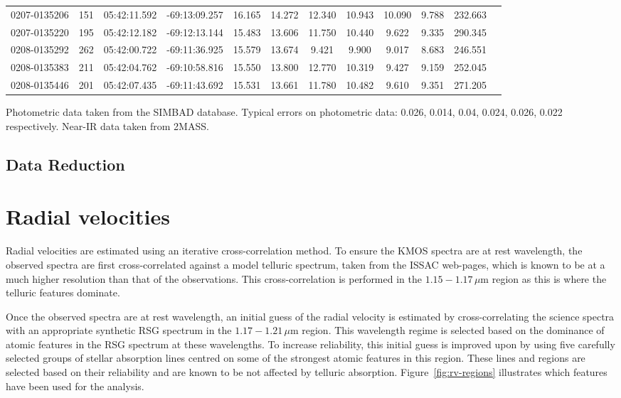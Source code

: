 \documentclass[useAMS,usenatbib]{mn2e}
\begin{document}
\begin{table}
\begin{center}
\begin{tabular}{lrcccccccccl}
0207-0135206 & 151 & 05:42:11.592 & -69:13:09.257 & 16.165 & 14.272 & 12.340 & 10.943 & 10.090 & 9.788 & 232.663\\
0207-0135220 & 195 & 05:42:12.182 & -69:12:13.144 & 15.483 & 13.606 & 11.750 & 10.440 &  9.622 & 9.335 & 290.345\\
0208-0135292 & 262 & 05:42:00.722 & -69:11:36.925 & 15.579 & 13.674 &  9.421 &  9.900 &  9.017 & 8.683 & 246.551\\
0208-0135383 & 211 & 05:42:04.762 & -69:10:58.816 & 15.550 & 13.800 & 12.770 & 10.319 &  9.427 & 9.159 & 252.045\\
0208-0135446 & 201 & 05:42:07.435 & -69:11:43.692 & 15.531 & 13.661 & 11.780 & 10.482 &  9.610 & 9.351 & 271.205\\
\hline
\end{tabular}
\end{center}
{Photometric data taken from the SIMBAD database. Typical errors on photometric data:
0.026, 0.014, 0.04, 0.024, 0.026, 0.022 respectively.
Near-IR data taken from 2MASS.}
\end{table}

\subsection{Data Reduction} %
\label{sub:data_reduction}


\section{Radial velocities} %
\label{sec:radial_velocities}
Radial velocities are estimated using an iterative cross-correlation method.
To ensure the KMOS spectra are at rest wavelength, the observed spectra are first cross-correlated against a model telluric spectrum, taken from the ISSAC web-pages, which is known to be at a much higher resolution than that of the observations.
This cross-correlation is performed in the $1.15-1.17\,\mu$m region as this is where the telluric features dominate.

Once the observed spectra are at rest wavelength, an initial guess of the radial velocity is estimated by cross-correlating the science spectra with an appropriate synthetic RSG spectrum in the $1.17-1.21\,\mu$m region.
This wavelength regime is selected based on the dominance of atomic features in the RSG spectrum at these wavelengths.
To increase reliability, this initial guess is improved upon by using five carefully selected groups of stellar absorption lines centred on some of the strongest atomic features in this region.
These lines and regions are selected based on their reliability and are known to be not affected by telluric absorption.
Figure~\ref{fig:rv-regions} illustrates which features have been used for the analysis.
\end{document}
